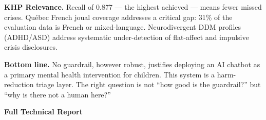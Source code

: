 \documentclass[10pt]{article}
\newenvironment{bluebox}{%
  \def\FrameCommand{{\color{khpblue}\vrule width 3pt}\colorbox{shadecolor}}%
  \MakeFramed{\advance\hsize-\width\FrameRestore}}%
{\endMakeFramed}
\begin{document}
\begin{bluebox}
\smallskip
\textbf{\color{khpblue}KHP Relevance.}\;
Recall of 0.877 --- the highest achieved --- means fewer missed crises.
Qu\'ebec French joual coverage addresses a critical gap:
31\% of the evaluation data is French or mixed-language.
Neurodivergent DDM profiles (ADHD/ASD) address systematic under-detection
of flat-affect and impulsive crisis disclosures.

\smallskip
\textbf{\color{riskred}Bottom line.}\;
No guardrail, however robust, justifies deploying an AI chatbot as a primary
mental health intervention for children.
This system is a harm-reduction triage layer.
The right question is not ``how good is the guardrail?'' but ``why is there not a human here?''
\end{bluebox}

\newpage

\begin{center}
{\large\bfseries\color{khpblue} Full Technical Report}
\end{center}
\end{document}
